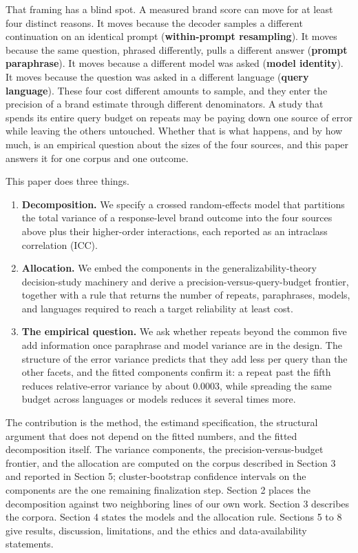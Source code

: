 \documentclass[pdflatex,sn-mathphys-num]{sn-jnl}
\begin{document}
That framing has a blind spot. A measured brand score can move for at least four distinct reasons. It moves because the decoder samples a different continuation on an identical prompt (\textbf{within-prompt resampling}). It moves because the same question, phrased differently, pulls a different answer (\textbf{prompt paraphrase}). It moves because a different model was asked (\textbf{model identity}). It moves because the question was asked in a different language (\textbf{query language}). These four cost different amounts to sample, and they enter the precision of a brand estimate through different denominators. A study that spends its entire query budget on repeats may be paying down one source of error while leaving the others untouched. Whether that is what happens, and by how much, is an empirical question about the sizes of the four sources, and this paper answers it for one corpus and one outcome.

This paper does three things.

\begin{enumerate}
\def\labelenumi{\arabic{enumi}.}
\item
  \textbf{Decomposition.} We specify a crossed random-effects model that partitions the total variance of a response-level brand outcome into the four sources above plus their higher-order interactions, each reported as an intraclass correlation (ICC).
\item
  \textbf{Allocation.} We embed the components in the generalizability-theory decision-study machinery and derive a precision-versus-query-budget frontier, together with a rule that returns the number of repeats, paraphrases, models, and languages required to reach a target reliability at least cost.
\item
  \textbf{The empirical question.} We ask whether repeats beyond the common five add information once paraphrase and model variance are in the design. The structure of the error variance predicts that they add less per query than the other facets, and the fitted components confirm it: a repeat past the fifth reduces relative-error variance by about 0.0003, while spreading the same budget across languages or models reduces it several times more.
\end{enumerate}

The contribution is the method, the estimand specification, the structural argument that does not depend on the fitted numbers, and the fitted decomposition itself. The variance components, the precision-versus-budget frontier, and the allocation are computed on the corpus described in Section 3 and reported in Section 5; cluster-bootstrap confidence intervals on the components are the one remaining finalization step. Section 2 places the decomposition against two neighboring lines of our own work. Section 3 describes the corpora. Section 4 states the models and the allocation rule. Sections 5 to 8 give results, discussion, limitations, and the ethics and data-availability statements.
\end{document}

